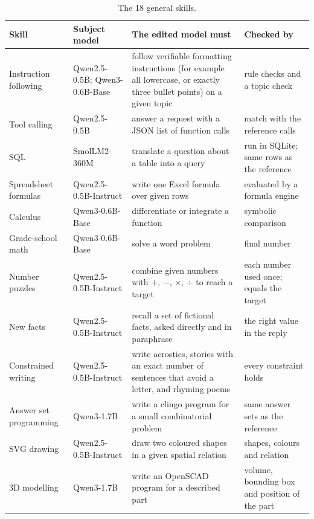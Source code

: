 \documentclass[11pt]{article}
\begin{document}
\begin{table}[!htbp]
  \centering
  \small
  \caption{The 18 general skills.}
  \label{tab:general-skills}
  \begin{tabularx}{\linewidth}{@{}>{\raggedright\arraybackslash}p{2.6cm}>{\raggedright\arraybackslash}p{2.7cm}>{\raggedright\arraybackslash}X>{\raggedright\arraybackslash}X@{}}
    \toprule
    Skill & Subject model & The edited model must & Checked by \\
    \midrule
    Instruction following & Qwen2.5-0.5B; Qwen3-0.6B-Base & follow verifiable formatting instructions (for example all lowercase, or exactly three bullet points) on a given topic & rule checks and a topic check \\
    Tool calling & Qwen2.5-0.5B & answer a request with a JSON list of function calls & match with the reference calls \\
    SQL & SmolLM2-360M & translate a question about a table into a query & run in SQLite; same rows as the reference \\
    Spreadsheet formulas & Qwen2.5-0.5B-Instruct & write one Excel formula over given rows & evaluated by a formula engine \\
    Calculus & Qwen3-0.6B-Base & differentiate or integrate a function & symbolic comparison \\
    Grade-school math & Qwen3-0.6B-Base & solve a word problem & final number \\
    Number puzzles & Qwen2.5-0.5B-Instruct & combine given numbers with $+$, $-$, $\times$, $\div$ to reach a target & each number used once; equals the target \\
    New facts & Qwen2.5-0.5B-Instruct & recall a set of fictional facts, asked directly and in paraphrase & the right value in the reply \\
    Constrained writing & Qwen2.5-0.5B-Instruct & write acrostics, stories with an exact number of sentences that avoid a letter, and rhyming poems & every constraint holds \\
    Answer set programming & Qwen3-1.7B & write a clingo program for a small combinatorial problem & same answer sets as the reference \\
    SVG drawing & Qwen2.5-0.5B-Instruct & draw two coloured shapes in a given spatial relation & shapes, colours and relation \\
    3D modelling & Qwen3-1.7B & write an OpenSCAD program for a described part & volume, bounding box and position of the part \\

\end{tabularx}
\end{table}
\end{document}
